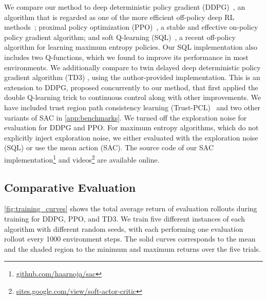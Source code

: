 \documentclass{article}
\begin{document}
We compare our method to deep deterministic policy gradient (DDPG)~\citep{lillicrap2015continuous}, an algorithm that is regarded as one of the more efficient off-policy deep RL methods~\citep{duan2016benchmarking}; proximal policy optimization (PPO)~\citep{schulman2017proximal}, a stable and effective on-policy policy gradient algorithm; and soft Q-learning (SQL)~\citep{haarnoja2017reinforcement}, a recent off-policy algorithm for learning maximum entropy policies. Our SQL implementation also includes two Q-functions, which we found to improve its performance in most environments. 
%
We additionally compare to twin delayed deep deterministic policy gradient algorithm (TD3) \citep{fujimoto2018addressing}, using the author-provided implementation. This is an extension to DDPG, proposed concurrently to our method, that first applied the double Q-learning trick to continuous control along with other improvements. We have included trust region path consistency learning (Trust-PCL)~\citep{nachum2017trust} and two other variants of SAC in \autoref{app:benchmarks}. We turned off the exploration noise for evaluation for DDPG and PPO. For maximum entropy algorithms, which do not explicitly inject exploration noise, we either evaluated with the exploration noise (SQL) or use the mean action (SAC). The source code of our SAC implementation\footnote{\href{http://github.com/haarnoja/sac}{github.com/haarnoja/sac}} and videos\footnote{\href{sites.google.com/view/soft-actor-critic}{sites.google.com/view/soft-actor-critic}} are available online.


\subsection{Comparative Evaluation}
\label{sec:evaluation}
%
\autoref{fig:training_curves} shows the total average return of evaluation rollouts during training for DDPG, PPO, and TD3. We train five different instances of each algorithm with different random seeds, with each performing one evaluation rollout every 1000 environment steps. The solid curves corresponds to the mean and the shaded region to the minimum and maximum returns over the five trials.
\end{document}
